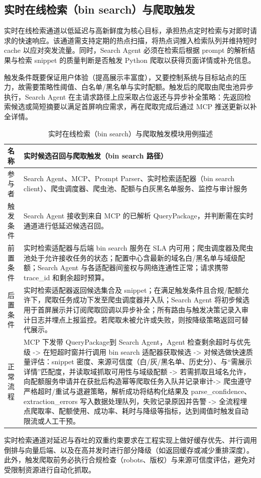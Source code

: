 \subsection{实时在线检索（bin search）与爬取触发} 
实时在线检索通道以低延迟与高新鲜度为核心目标，承担热点定时检索与对即时请求的快速响应。该通道需支持定期的热点扫描，将热点词推入检索队列并维持短时 cache 以应对突发流量。同时，Search Agent 必须在检索后根据 prompt 的解析结果与检索 snippet 的质量判断是否触发 Python 爬取以获得页面详情或补充信息。

触发条件既要保证用户体验（提高展示丰富度），又要控制系统与目标站点的压力，故需要策略性阈值、白名单/黑名单与实时配额。触发后的爬取由爬虫池异步执行，Search Agent 在主请求路径上应采取占位返还与异步补全策略：先返回检索候选或简短摘要以满足首屏响应需求，再在爬取完成后通过 MCP 推送更新以补全详情。

\begin{table}[H]
\centering
\caption{实时在线检索（bin search）与爬取触发模块用例描述}
\label{tab:nonperiodic-usecase}
{\renewcommand{\arraystretch}{1.}
\begin{tabular}{p{3cm} p{11cm}}
\hline
名称 & 实时候选召回与爬取触发（bin search 路径） \\ \hline
参与者 & Search Agent、MCP、Prompt Parser、实时检索适配器（bin search client）、爬虫调度器、爬虫池、配额与白灰黑名单服务、监控与审计服务 \\ \hline
触发条件 & Search Agent 接收到来自 MCP 的已解析 QueryPackage，并判断需在实时通道进行低延迟候选召回。 \\ \hline
前置条件 & 实时检索适配器与后端 bin search 服务在 SLA 内可用；爬虫调度器及爬虫池处于允许接收任务的状态；配置中心含最新的域名白/黑名单与域级配额；Search Agent 与各适配器间鉴权与网络连通性正常；请求携带 trace\_id 和剩余超时预算。 \\ \hline
后置条件 & 实时检索适配器返回候选集合及 snippet；在满足触发条件且合规/配额允许下，爬取任务成功下发至爬虫调度器并入队；Search Agent 将初步候选用于首屏展示并订阅爬取回调以异步补全；所有路由与触发决策记录入审计日志并埋点上报监控。若爬取未被允许或失败，则按降级策略返回可替代展示。 \\ \hline
正常流程 &
MCP 下发带 QueryPackage到 Search Agent，Agent 检查剩余超时与优先级 -> 在短超时窗并行调用 bin search 适配器获取候选 -> 对候选做快速质量评估：snippet 密度、来源可信度（白/灰/黑名单、历史分）、与“需展示详情”匹配度，并读取域抓取可用性与域级配额 -> 若需抓取且域名允许，向配额服务申请并在获批后构造幂等爬取任务入队并记录审计-> 爬虫遵守严格超时/重试与退避策略，解析成功将结构化结果及 parse\_confidence、extraction\_errors 写入数据处理队列，失败记录原因并告警 -> 全流程埋点爬取率、配额使用、成功率、耗时与降级等指标，达到阈值时触发自动限流或人工干预。\\
\hline
\end{tabular}
}
\end{table}
实时检索通道对延迟与吞吐的双重约束要求在工程实现上做好缓存优先、并行调用倒排与向量后端、以及在高并发时进行部分降级（如返回缓存或减少重排深度）。此外，触发爬取前务必执行合规检查（robots、版权）与来源可信度评估，避免对受限制资源进行自动化抓取。

